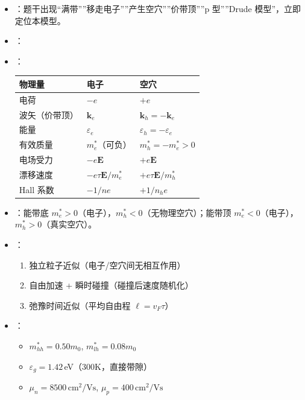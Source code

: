 \begin{tipbox}[快速识别与解题技巧]
\begin{itemize}
    \item {}：题干出现``满带''''移走电子''''产生空穴''''价带顶''''p 型''''Drude 模型''，立即定位本模型。
    \item {}：
    \begin{center}
    \end{center}
    \item {}：
    \begin{center}
    \begin{tabular}{lll}
    \toprule
    \textbf{物理量} & \textbf{电子} & \textbf{空穴} \\
    \midrule
    电荷 & $-e$ & $+e$ \\
    波矢（价带顶） & $\mathbf{k}_e$ & $\mathbf{k}_h=-\mathbf{k}_e$ \\
    能量 & $\varepsilon_e$ & $\varepsilon_h=-\varepsilon_e$ \\
    有效质量 & $m_e^*$（可负） & $m_h^*=-m_e^*>0$ \\
    电场受力 & $-e\mathbf{E}$ & $+e\mathbf{E}$ \\
    漂移速度 & $-e\tau\mathbf{E}/m_e^*$ & $+e\tau\mathbf{E}/m_h^*$ \\
    Hall 系数 & $-1/ne$ & $+1/n_h e$ \\
    \bottomrule
    \end{tabular}
    \end{center}
    \item {}：能带底 $m_e^*>0$（电子），$m_h^*<0$（无物理空穴）；能带顶 $m_e^*<0$（电子），$m_h^*>0$（真实空穴）。
    \item {}：
    \begin{enumerate}[nosep]
        \item 独立粒子近似（电子/空穴间无相互作用）
        \item 自由加速 + 瞬时碰撞（碰撞后速度随机化）
        \item 弛豫时间近似（平均自由程 $\ell=v_F\tau$）
    \end{enumerate}
    \item {}：
    \begin{itemize}[nosep]
        \item $m_{hh}^*=0.50m_0$, $m_{lh}^*=0.08m_0$
        \item $\varepsilon_g=1.42\,$eV（300K，直接带隙）
        \item $\mu_n=8500\,\text{cm}^2/\text{Vs}$, $\mu_p=400\,\text{cm}^2/\text{Vs}$
    \end{itemize}
\end{itemize}
\end{tipbox}

